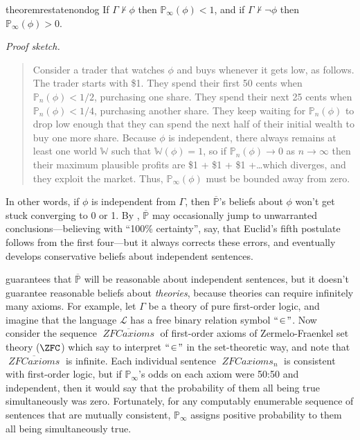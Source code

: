\documentclass[authordate,onecolumn,noenvironments]{miri-tech-article}
\numberwithin{equation}{subsection}
\newenvironment{sketch}[1][]{\noindent\emph{Proof sketch.}\proofin{#1}\begin{quote}}{\end{quote}}
\newcommand{\quot}[1]{``#1"}
\newcommand{\seq}[1]{{\overline{#1}}}
\newcommand{\nn}{n}
\newcommand{\rparenthetical}[1]{\hfill\upshape{{\small (#1)}}} %
\newcommand{\proofin}[1]{\rparenthetical{Proof in:~#1.}}
\newcommand{\BelState}{\mathbb{P}}
\newcommand{\pt}{\BelState}
\newcommand{\MP}{\seq{\pt}}
\newcommand{\World}{\mathbb{W}}
\newcommand{\Theory}{\Gamma}
\newcommand{\Lang}{\mathcal{L}}
\newcommand{\zfseq}{\mathit{\operatorname{ZFCaxioms}}}
\begin{document}
\begin{restatable}{theorem}{restatenondog}\label{thm:nd}
 If $\Theory \nvdash \phi$ then 
  $\pt_\infty(\phi)<1$, and if $\Theory \nvdash \neg\phi$ then $\pt_\infty(\phi)>0$.
\end{restatable}

\begin{sketch}[\ref{app:nondog}] Consider a trader that watches $\phi$ and buys whenever it gets low, as follows. The trader starts with \$1. They spend their first 50 cents when $\pt_\nn(\phi) < 1/2$, purchasing one share. They spend their next 25 cents when $\pt_\nn(\phi) < 1/4$, purchasing another share. They keep waiting for $\pt_\nn(\phi)$ to drop low enough that they can spend the next half of their initial wealth to buy one more share. Because $\phi$ is independent, there always remains at least one world $\World$ such that $\World(\phi)=1$, so if $\pt_\nn(\phi) \to 0$ as $n \to\infty$ then their maximum plausible profits are \$1 + \$1 + \$1 +\dots which diverges, and they exploit the market. Thus, $\pt_\infty(\phi)$ must be bounded away from zero.
\end{sketch}

In other words, if $\phi$ is independent from $\Theory$, then $\MP$'s beliefs about $\phi$ won't get stuck converging to 0 or 1. By , $\MP$ may occasionally jump to unwarranted conclusions---believing with ``100\% certainty'', say, that Euclid's fifth postulate follows from the first four---but it always corrects these errors, and eventually develops conservative beliefs about independent sentences.

 guarantees that $\MP$ will be reasonable about independent sentences, but it doesn't guarantee reasonable beliefs about \emph{theories}, because theories can require infinitely many axioms. For example, let $\Theory$ be a theory of pure first-order logic, and imagine that the language $\Lang$ has a free binary relation symbol $\quot{\!\in\!}$. Now consider the sequence $\seq{\zfseq}$ of first-order axioms of Zermelo-Fraenkel set theory ($\ZFC$) which say to interpret $\quot{\!\in\!}$ in the set-theoretic way, and note that $\seq{\zfseq}$ is infinite. Each individual sentence $\zfseq_\nn$ is consistent with first-order logic, but if $\pt_\infty$'s odds on each axiom were 50:50 and independent, then it would say that the probability of them all being true simultaneously was zero. Fortunately, for any computably enumerable sequence of sentences that are mutually consistent, $\pt_\infty$ assigns positive probability to them all being simultaneously true.
\end{document}
